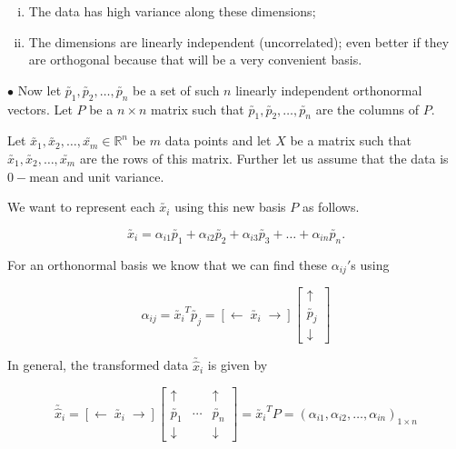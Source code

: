 \documentclass[11pt, a4paper]{article}
\begin{document}
\begin{enumerate}[(i)]

\item The data has high variance along these dimensions;

\item The dimensions are linearly independent (uncorrelated); even better if they are orthogonal because that will be a very convenient basis. \\

\end{enumerate}


\vspace{0.3cm}

$\bullet$ Now let $\utilde{p_1}, \utilde{p_2}, \ldots , \utilde{p_n}$ be a set of such $n$ linearly independent orthonormal vectors. Let $P$ be a $n \times n$ matrix such that $\utilde{p_1}, \utilde{p_2}, \ldots , \utilde{p_n}$ are the columns of $P$. \\

\vspace{0.3cm}

Let $\utilde{x_1}, \utilde{x_2}, \ldots , \utilde{x_m} \in \mathbb{R}^n$ be $m$ data points and let $X$ be a matrix such that $\utilde{x_1}, \utilde{x_2}, \ldots , \utilde{x_m}$ are the rows of this matrix. Further let us assume that the data is $0-$mean and unit variance. \\

\vspace{0.3cm}

We want to represent each $\utilde{x_i}$ using this new basis $P$ as follows.

$$\utilde{x_i} = \alpha_{i1} \utilde{p_1} + \alpha_{i2} \utilde{p_2} + \alpha_{i3} \utilde{p_3} + \ldots + \alpha_{in} \utilde{p_n}.$$

For an orthonormal basis we know that we can find these $\alpha_{ij}'$s using

\[
\alpha_{ij} = \utilde{x_i}^T \utilde{p_j} = 
\left[
\leftarrow \; \utilde{x_i} \; \rightarrow
\right]
\begin{bmatrix}
\uparrow \\
\utilde{p_j} \\
\downarrow
\end{bmatrix}
\]

In general, the transformed data $\utilde{\hat{x}_i}$ is given by

\[
\utilde{\hat{x}_i} = 
\left[ \leftarrow \; \utilde{x_i} \; \rightarrow \right]
\begin{bmatrix}
\uparrow & & \uparrow \\
\utilde{p_1} & \cdots & \utilde{p_n} \\
\downarrow & & \downarrow
\end{bmatrix}
= \utilde{x_i}^T P 
= \left( \alpha_{i1}, \alpha_{i2}, \ldots, \alpha_{in} \right)_{1 \times n}
\]
\end{document}
